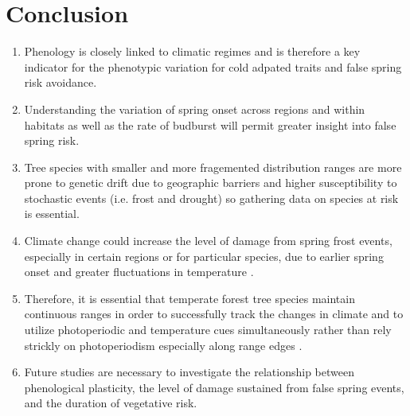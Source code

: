 \documentclass{article}\usepackage[]{graphicx}\usepackage[]{color}
\begin{document}
\section*{Conclusion}
\begin{enumerate}
\item Phenology is closely linked to climatic regimes \citep{Wolkovich2011} and is therefore a key indicator for the phenotypic variation for cold adpated traits and false spring risk avoidance.
\item Understanding the variation of spring onset across regions and within habitats as well as the rate of budburst will permit greater insight into false spring risk.
\item Tree species with smaller and more fragemented distribution ranges are more prone to genetic drift due to geographic barriers and higher susceptibility to stochastic events (i.e. frost and drought) \citep{Alberto2013} so gathering data on species at risk is essential. 
\item Climate change could increase the level of damage from spring frost events, especially in certain regions or for particular species, due to earlier spring onset and greater fluctuations in temperature \citep{Martin2010}. 
\item Therefore, it is essential that temperate forest tree species maintain continuous ranges in order to successfully track the changes in climate and to utilize photoperiodic and temperature cues simultaneously rather than rely strickly on photoperiodism especially along range edges \citep{Zohner2016, Gauzere2017}.
\item Future studies are necessary to investigate the relationship between phenological plasticity, the level of damage sustained from false spring events, and the duration of vegetative risk. 
\end{enumerate}





\end{document}
